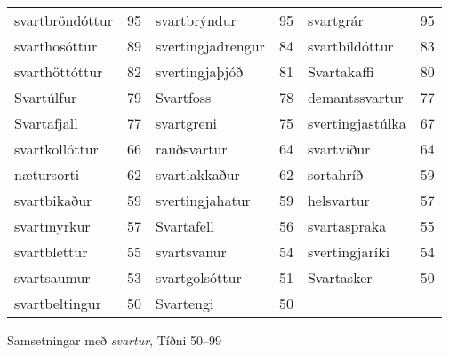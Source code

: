 \documentclass[../samsetningasafn.tex]{subfiles}
\begin{document}
\clearpage

\begin{wordlist}[ht!]
\begin{tcolorbox}

	\setlength{\extrarowheight}{3pt}
	\begin{tabular}{BlBlBl}
		svartbröndóttur	& 95	& 
		svartbrýndur		& 95	& 
		svartgrár		& 95	\\ 
		svarthosóttur	& 89	& 
		svertingjadrengur	& 84	& 
		svartbíldóttur	& 83	\\ 
		svarthöttóttur	& 82	& 
		svertingjaþjóð	& 81	& 
		Svartakaffi		& 80	\\ 
		Svartúlfur		& 79	& 
		Svartfoss		& 78	& 
		demantssvartur	& 77	\\ 
		Svartafjall		& 77	& 
		svartgreni		& 75	& 
		svertingjastúlka	& 67	\\ 
		svartkollóttur	& 66	& 
		rauðsvartur		& 64	& 
		svartviður		& 64	\\ 
		nætursorti		& 62	& 
		svartlakkaður	& 62	& 
		sortahríð		& 59	\\ 
		svartbikaður		& 59	& 
		svertingjahatur	& 59	& 
		helsvartur		& 57	\\ 
		svartmyrkur		& 57	& 
		Svartafell		& 56	& 
		svartaspraka		& 55	\\ 
		svartblettur		& 55	& 
		svartsvanur		& 54	& 
		svertingjaríki		& 54	\\ 
		svartsaumur		& 53	& 
		svartgolsóttur	& 51	& 
		Svartasker		& 50	\\ 
		svartbeltingur	& 50	& 
		Svartengi		& 50	& 
					&
	\end{tabular}

\end{tcolorbox}
	\caption{Samsetningar með \textit{svartur}, Tíðni 50--99}
	\label{listi:svart.50}
\end{wordlist}
\end{document}
